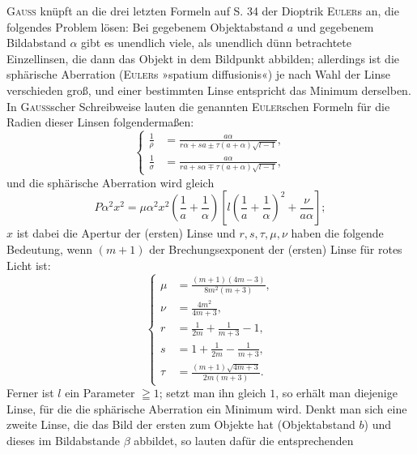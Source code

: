 \textsc{Gauss} knüpft an die drei letzten Formeln auf S. 34 der Dioptrik \textsc{Euler}s an, die folgendes Problem lösen: Bei gegebenem Objektabstand $a$ und gegebenem Bildabstand $\alpha$ gibt es unendlich viele, als unendlich dünn betrachtete Einzellinsen, die dann das Objekt in dem Bildpunkt abbilden; allerdings ist die sphärische Aberration (\textsc{Euler}s »spatium diffusionis«) je nach Wahl der Linse verschieden groß, und einer bestimmten Linse entspricht das Minimum derselben. In \textsc{Gauss}scher Schreibweise lauten die genannten \textsc{Euler}schen Formeln für die Radien dieser Linsen folgendermaßen:
\begin{equation*}\tag*{($\alpha$)}
\left\{\begin{aligned}
\frac1\rho&=\frac{a\alpha}{r\alpha+sa\pm\tau(a+\alpha)\sqrt{l-1}},\\[5pt]
\frac1\sigma&=\frac{a\alpha}{ra+s\alpha\mp\tau(a+\alpha)\sqrt{l-1}},
\end{aligned}\right.
\end{equation*}
\noindent und die sphärische Aberration wird gleich
\begin{equation*}\tag*{($\beta$)}
P\alpha^2x^2=\mu\alpha^2x^2\left(\frac1a+\frac1\alpha\right)
\left[l\left(\frac1a+\frac1\alpha\right)^2+\frac\nu{a\alpha}\right];
\end{equation*}
\noindent $x$ ist dabei die Apertur der (ersten) Linse und $r,s,\tau,\mu,\nu$ haben die folgende Bedeutung, wenn $(m+1)$ der Brechungsexponent der (ersten) Linse für rotes Licht ist:
\begin{equation*}\tag*{($\gamma$)}
\left\{\begin{aligned}
\mu&=\frac{(m+1)(4m-3)}{8m^2(m+3)},\\[4pt]
\nu&=\frac{4m^2}{4m+3},\\[4pt]
r&=\frac1{2m}+\frac1{m+3}-1,\\[4pt]
s&=1+\frac1{2m}-\frac1{m+3},\\[4pt]
\tau&=\frac{(m+1)\sqrt{4m+3}}{2m(m+3)}.
\end{aligned}\right.
\end{equation*}
\noindent Ferner ist $l$ ein Parameter $\geqq1$; setzt man ihn gleich $1$, so erhält man diejenige Linse, für die die sphärische Aberration ein Minimum wird. Denkt man sich eine zweite Linse, die das Bild der ersten zum Objekte hat (Objektabstand $b$) und dieses im Bildabstande $\beta$ abbildet, so lauten dafür die entsprechenden
\clearpage{}

